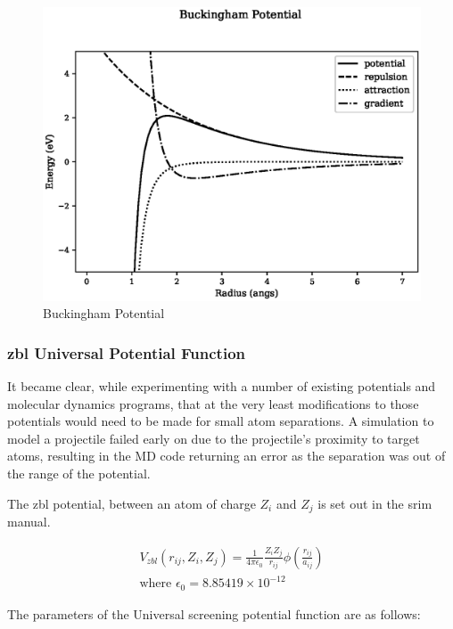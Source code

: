 \begin{figure}[!htbp]
  \begin{center}
    \includegraphics[width=.6\linewidth]{chapters/interatomic_potential_fitting/plots_pair_potentials/buckingham.eps}
    \caption{Buckingham Potential}
    \label{fig:buckinghamplot}
  \end{center}
\end{figure}





\FloatBarrier
\subsubsection{\acrlong{zbl} Universal Potential Function}
\label{section:ZBL}

It became clear, while experimenting with a number of existing potentials and molecular dynamics programs, that at the very least modifications to those potentials would need to be made for small atom separations.  A simulation to model a projectile failed early on due to the projectile's proximity to target atoms, resulting in the MD code returning an error as the separation was out of the range of the potential.

The \acrlong{zbl} potential, between an atom of charge $Z_i$ and $Z_j$ is set out in the \acrshort{srim} manual\cite{srimbook}.


\begin{equation}
\begin{split}
V_{zbl}(r_{ij}, Z_i, Z_j) = \frac{1}{4 \pi \epsilon_0} \frac{Z_i Z_j}{r_{ij}} \phi \left( \frac{r_{ij}}{a_{ij}} \right) \\
\text{where } \epsilon_0 = 8.85419\times 10^{-12} 
\end{split}
\label{eq:zblequation}
\end{equation}

The parameters of the Universal screening potential function are as follows:

